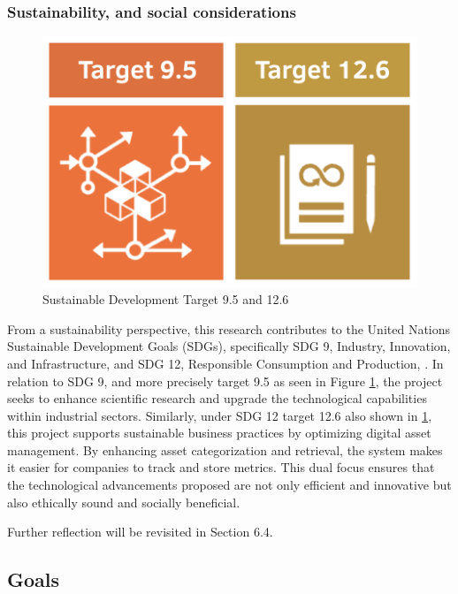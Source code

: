 \documentclass[a4paper,10pt,twocolumn]{article}
\numberwithin{figure}{section}
\numberwithin{table}{section}
\begin{document}
\subsubsection{Sustainability, and social considerations}
\begin{figure}[htbp]
    \centering
    \includegraphics[width=0.48\linewidth]{targets.png}  %
    \caption{Sustainable Development Target 9.5 and 12.6}
    \label{fig:targets}  
\end{figure}

From a sustainability perspective, this research contributes to the United Nations Sustainable 
Development Goals (SDGs), specifically SDG 9, Industry, Innovation, and Infrastructure, and SDG 12, 
Responsible Consumption and Production, \citep{UN2030Agenda}. 
In relation to SDG 9, and more precisely 
target 9.5 as seen in Figure \ref{fig:targets}, the project seeks to enhance scientific 
research and upgrade the technological capabilities
 within industrial sectors. Similarly, under SDG 12 target 12.6 also shown in \ref{fig:targets}, 
 this project supports sustainable business practices by optimizing digital 
asset management. By enhancing asset categorization and retrieval, the system makes it easier 
for companies to track and store metrics. This dual focus ensures that the technological advancements 
proposed are not only efficient and innovative but also ethically sound and socially beneficial.

\vspace{0.3cm}
Further reflection will be revisited in Section 6.4.



\subsection{Goals}
\end{document}
